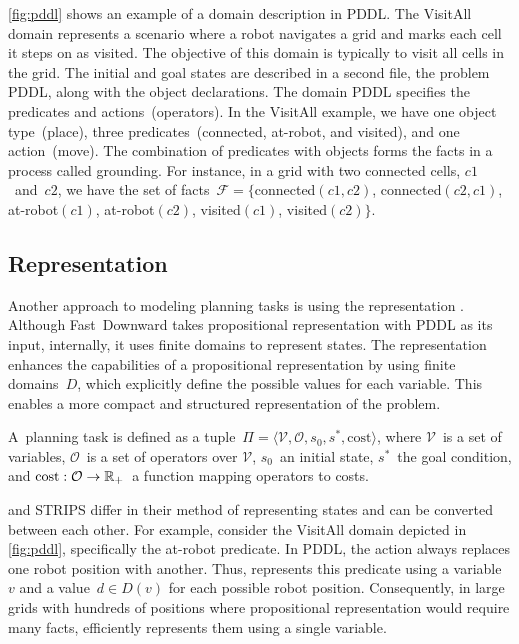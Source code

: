 \cref{fig:pddl} shows an example of a domain description in PDDL. The VisitAll domain represents a scenario where a robot navigates a grid and marks each cell it steps on as visited. The objective of this domain is typically to visit all cells in the grid. The initial and goal states are described in a second file, the problem PDDL, along with the object declarations. The domain PDDL specifies the predicates and actions~(operators). In the VisitAll example, we have one object type~(place), three predicates~(connected, at-robot, and visited), and one action~(move). The combination of predicates with objects forms the facts in a process called grounding. For instance, in a grid with two connected cells, $c1$~and~$c2$, we have the set of facts~$\mathcal{F}=\{$connected$(c1,c2)$, \mbox{connected$(c2,c1)$}, \mbox{at-robot$(c1)$}, \mbox{at-robot$(c2)$}, \mbox{visited$(c1)$}, visited$(c2)\}$.

\subsection{\sas Representation}
\label{sec:sasplus}

Another approach to modeling planning tasks is using the \sas representation \cite{Backstrom.Nebel/1995}. Although Fast~Downward takes propositional representation with PDDL as its input, internally, it uses finite domains to represent states. The \sas representation enhances the capabilities of a propositional representation by using finite domains~$D$, which explicitly define the possible values for each variable. This enables a more compact and structured representation of the problem.

\begin{definition}
    \label{def:sasplus}
    A~\sas planning task is defined as a tuple~$\Pi=\langle\mathcal{V},\mathcal{O},s_0,s^*, \text{cost}\rangle$, where $\mathcal{V}$~is a set of variables, $\mathcal{O}$~is a set of operators over $\mathcal{V}$, $s_0$~an initial state, $s^*$~the goal condition, and $\text{cost}:\mathcal{O}\rightarrow\mathbb{R}_{+}$~a function mapping operators to costs.
\end{definition}

\sas and STRIPS differ in their method of representing states and can be converted between each other. For example, consider the VisitAll domain depicted in \cref{fig:pddl}, specifically the at-robot predicate. In PDDL, the action always replaces one robot position with another. Thus, \sas represents this predicate using a variable~$v$ and a value~$d \in D(v)$ for each possible robot position. Consequently, in large grids with hundreds of positions where propositional representation would require many facts, \sas efficiently represents them using a single variable.

